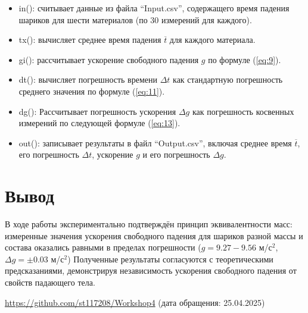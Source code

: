 \begin{itemize}
\item in(): считывает данные из файла ``Input.csv'', содержащего время падения шариков для шести материалов (по 30 измерений для каждого).
\item tx(): вычисляет среднее время падения $\overline{t}$ для каждого материала.
\item gi(): рассчитывает ускорение свободного падения $g$ по формуле (\ref{eq:9}).
\item dt(): вычисляет погрешность времени $\Delta t$ как стандартную погрешность среднего значения по формуле (\ref{eq:11}).
\item dg(): Рассчитывает погрешность ускорения $\Delta g$ как погрешность косвенных измерений по следующей формуле (\ref{eq:13}).
\item out(): записывает результаты в файл ``Output.csv'', включая среднее время $\overline{t}$, его погрешность $\Delta t$, ускорение $g$ и его погрешность $\Delta g$.
\end{itemize}

\section{Вывод}
В ходе работы экспериментально подтверждён принцип эквивалентности масс: измеренные значения ускорения свободного падения для шариков разной массы и состава оказались равными в пределах погрешности ($g = 9.27 - 9.56$ м/с$^2$, $\Delta g = \pm 0.03$ м/с$^2$) Полученные результаты согласуются с теоретическими предсказаниями, демонстрируя независимость ускорения свободного падения от свойств падающего тела.

\begin{thebibliography}{9}
\url{https://github.com/st117208/Workshop4}  (дата обращения: 25.04.2025)
\end{thebibliography}
